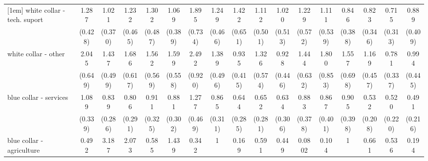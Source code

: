 {\begin{tabular}{l*{16}{c}}
[1em]
white collar - tech. suport&       1.287         &       1.021         &       1.232         &       1.302         &       1.069         &       1.895         &       1.249         &       1.422         &       1.112         &       1.020         &       1.229         &       1.111         &       0.846         &       0.823         &       0.715         &       0.889         \\
                    &     (0.428)         &     (0.370)         &     (0.465)         &     (0.487)         &     (0.389)         &     (0.734)         &     (0.466)         &     (0.651)         &     (0.501)         &     (0.513)         &     (0.572)         &     (0.539)         &     (0.388)         &     (0.346)         &     (0.313)         &     (0.409)         \\
[1em]
white collar - other&       2.045\sym{*}  &       1.437         &       1.686         &       1.562         &       1.599         &       2.492\sym{*}  &       1.389         &       0.935         &       1.326         &       0.928         &       1.444         &       1.800         &       1.557         &       1.169         &       0.781         &       0.994         \\
                    &     (0.649)         &     (0.499)         &     (0.617)         &     (0.569)         &     (0.558)         &     (0.920)         &     (0.496)         &     (0.415)         &     (0.574)         &     (0.446)         &     (0.632)         &     (0.853)         &     (0.698)         &     (0.457)         &     (0.337)         &     (0.445)         \\
[1em]
blue collar - services&       1.089         &       0.839         &       0.806         &       0.911         &       0.881         &       1.277         &       0.865         &       0.644         &       0.652         &       0.634         &       0.883         &       0.867         &       0.905         &       0.532         &       0.520         &       0.491         \\
                    &     (0.339)         &     (0.286)         &     (0.291)         &     (0.325)         &     (0.302)         &     (0.469)         &     (0.311)         &     (0.285)         &     (0.281)         &     (0.306)         &     (0.378)         &     (0.401)         &     (0.398)         &     (0.208)         &     (0.220)         &     (0.216)         \\
[1em]
blue collar - agriculture&       0.492         &       3.187         &       2.073         &       0.585         &       1.439         &       0.342         &           1         &       0.169         &       0.591         &       0.449         &      0.0802\sym{*}  &       0.104         &           1         &       0.661         &       0.536         &       0.194         \\

\end{tabular}}
